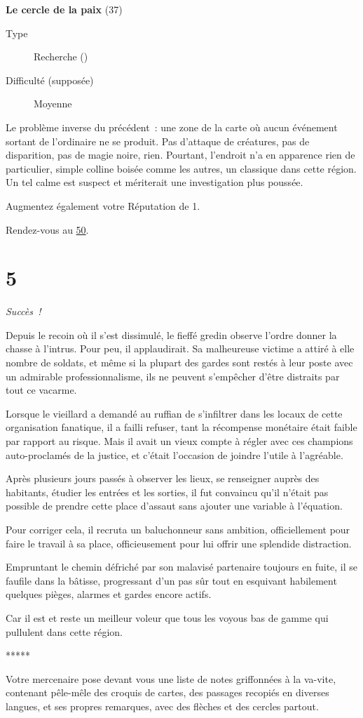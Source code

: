 \documentclass{report}
\newcommand{\gsection}[1]{
    \section{#1}
    \label{section-#1}
}
\newcommand{\glink}[1]{\hyperref[section-#1]{#1}}
\newcommand{\quest}[5]{
    \begin{mdframed}[innertopmargin=0.5cm,innerbottommargin=0.5cm]
        \begin{center}
            \textbf{#1} (#2)
        \end{center}
        \begin{description}
            \item[Type] #3
            \item[Difficulté (supposée)] #4
        \end{description}
        #5
    \end{mdframed}
}
\newcommand{\ellipse}{
    \begin{center}
        *****
    \end{center}
}
\newcommand{\success}{
    \emph{Succès !}
}
\begin{document}
\quest{Le cercle de la paix}{37}{Recherche (\caduceus)}{Moyenne}{
Le problème inverse du précédent : une zone de la carte où aucun événement sortant de l'ordinaire ne se produit. Pas d'attaque de créatures, pas de disparition, pas de magie noire, rien. Pourtant, l'endroit n'a en apparence rien de particulier, simple colline boisée comme les autres, un classique dans cette région. Un tel calme est suspect et mériterait une investigation plus poussée.
}

Augmentez également votre Réputation de 1.

Rendez-vous au \glink{50}.

\gsection{5}

\success

Depuis le recoin où il s'est dissimulé, le fieffé gredin observe l'ordre donner la chasse à l'intrus. Pour peu, il applaudirait. Sa malheureuse victime a attiré à elle nombre de soldats, et même si la plupart des gardes sont restés à leur poste avec un admirable professionnalisme, ils ne peuvent s'empêcher d'être distraits par tout ce vacarme.

Lorsque le vieillard a demandé au ruffian de s'infiltrer dans les locaux de cette organisation fanatique, il a failli refuser, tant la récompense monétaire était faible par rapport au risque. Mais il avait un vieux compte à régler avec ces champions auto-proclamés de la justice, et c'était l'occasion de joindre l'utile à l'agréable.

Après plusieurs jours passés à observer les lieux, se renseigner auprès des habitants, étudier les entrées et les sorties, il fut convaincu qu'il n'était pas possible de prendre cette place d'assaut sans ajouter une variable à l'équation.

Pour corriger cela, il recruta un baluchonneur sans ambition, officiellement pour faire le travail à sa place, officieusement pour lui offrir une splendide distraction.

Empruntant le chemin défriché par son malavisé partenaire toujours en fuite, il se faufile dans la bâtisse, progressant d'un pas sûr tout en esquivant habilement quelques pièges, alarmes et gardes encore actifs.

Car il est et reste un meilleur voleur que tous les voyous bas de gamme qui pullulent dans cette région.

\ellipse

Votre mercenaire pose devant vous une liste de notes griffonnées à la va-vite, contenant pêle-mêle des croquis de cartes, des passages recopiés en diverses langues, et ses propres remarques, avec des flèches et des cercles partout.
\end{document}
